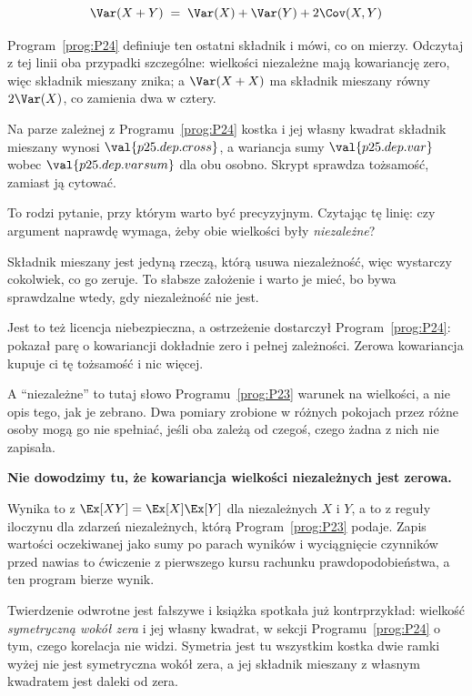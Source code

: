 \begin{fr}

\[ \Var(X + Y) \;=\; \Var(X) + \Var(Y) + 2\Cov(X, Y) \]

Program~\ref{prog:P24} definiuje ten ostatni składnik i mówi, co on mierzy.
Odczytaj z tej linii oba przypadki szczególne: wielkości niezależne mają
kowariancję zero, więc składnik mieszany znika; a $\Var(X + X)$ ma składnik
mieszany równy $2\Var(X)$, co zamienia dwa w cztery.

Na parze zależnej z Programu~\ref{prog:P24} \dash{} kostka i jej własny
kwadrat \dash{} składnik mieszany wynosi $\val{p25.dep.cross}$, a wariancja
sumy $\val{p25.dep.var}$ wobec $\val{p25.dep.varsum}$ dla obu osobno. Skrypt
sprawdza tożsamość, zamiast ją cytować.

To rodzi pytanie, przy którym warto być precyzyjnym. Czytając tę linię: czy
argument naprawdę wymaga, żeby obie wielkości były \emph{niezależne}?
\dotline
\nextframe
\end{fr}

\begin{fr}

Składnik mieszany jest jedyną rzeczą, którą usuwa niezależność, więc wystarczy
cokolwiek, co go zeruje. To słabsze założenie i warto je mieć, bo bywa
sprawdzalne wtedy, gdy niezależność nie jest.

Jest to też licencja niebezpieczna, a ostrzeżenie dostarczył
Program~\ref{prog:P24}: pokazał parę o kowariancji dokładnie zero i pełnej
zależności. Zerowa kowariancja kupuje ci tę tożsamość i nic więcej.

A \enquote{niezależne} to tutaj słowo Programu~\ref{prog:P23} \dash{} warunek
na wielkości, a nie opis tego, jak je zebrano. Dwa pomiary zrobione w różnych
pokojach przez różne osoby mogą go nie spełniać, jeśli oba zależą od czegoś,
czego żadna z nich nie zapisała.
\end{fr}

\begin{fr}
\begin{rigourbox}
\textbf{Nie dowodzimy tu, że kowariancja wielkości niezależnych jest zerowa.}

Wynika to z $\Ex[XY] = \Ex[X]\Ex[Y]$ dla niezależnych $X$ i $Y$, a to z reguły
iloczynu dla zdarzeń niezależnych, którą Program~\ref{prog:P23} podaje. Zapis
wartości oczekiwanej jako sumy po parach wyników i wyciągnięcie czynników
przed nawias to ćwiczenie z pierwszego kursu rachunku prawdopodobieństwa, a
ten program bierze wynik.

Twierdzenie odwrotne jest fałszywe i książka spotkała już kontrprzykład:
wielkość \emph{symetryczną wokół zera} i jej własny kwadrat, w sekcji
Programu~\ref{prog:P24} o tym, czego
korelacja nie widzi. Symetria jest tu wszystkim \dash{} kostka dwie ramki
wyżej nie jest symetryczna wokół zera, a jej składnik mieszany z własnym
kwadratem jest daleki od zera.
\end{rigourbox}
\end{fr}

